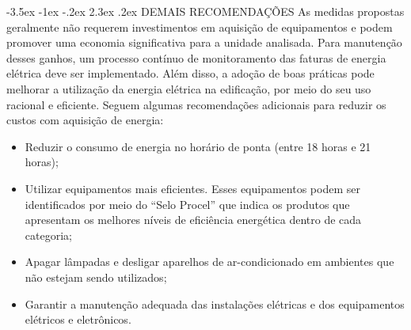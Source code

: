 \documentclass[a4paper,12pt]{abntex2}
\makeatletter
\renewcommand\chapter{\@startsection{chapter}{0}{\z@}%
  {-3.5ex \@plus -1ex \@minus -.2ex}%
  {2.3ex \@plus.2ex}%
  {\normalfont\Large\bfseries}}
\makeatother
\begin{document}
\chapter{DEMAIS RECOMENDAÇÕES}
As  medidas  propostas  geralmente  não  requerem  investimentos  em  aquisição  de 
equipamentos e podem promover uma economia significativa para a unidade analisada. 
Para manutenção desses ganhos, um processo contínuo de monitoramento das faturas de 
energia elétrica deve ser implementado. 
Além  disso, a adoção de boas práticas pode melhorar a utilização da energia elétrica na 
edificação,  por meio  do  seu  uso  racional  e  eficiente.  Seguem  algumas  recomendações 
adicionais para reduzir os custos com aquisição de energia:
\begin{itemize}
    \item  Reduzir o consumo de energia no horário de ponta (entre 18 horas e 21 horas);
    \item  Utilizar equipamentos mais eficientes. Esses equipamentos podem ser identificados 
    por meio do “Selo Procel” que indica os produtos que apresentam os melhores níveis de 
    eficiência energética dentro de cada categoria;
    \item   Apagar lâmpadas e desligar aparelhos de ar-condicionado em ambientes que não 
    estejam sendo utilizados;
    \item  Garantir  a  manutenção  adequada  das  instalações  elétricas  e  dos  equipamentos 
    elétricos e eletrônicos. 
\end{itemize}
\end{document}

